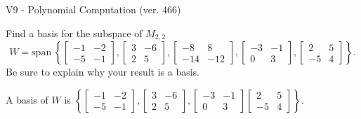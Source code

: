 \begin{exercise}
  \begin{exerciseTitle}V9 - Polynomial Computation (ver. 466)\end{exerciseTitle}
  \begin{exerciseStatement}
    Find a basis for the subspace of \(M_{2,2}\) 
\[W=\mathrm{span}\ \left\{\left[\begin{array}{cc}
-1 & -2 \\
-5 & -1
\end{array}\right] , \left[\begin{array}{cc}
3 & -6 \\
2 & 5
\end{array}\right] , \left[\begin{array}{cc}
-8 & 8 \\
-14 & -12
\end{array}\right] , \left[\begin{array}{cc}
-3 & -1 \\
0 & 3
\end{array}\right] , \left[\begin{array}{cc}
2 & 5 \\
-5 & 4
\end{array}\right]\right\}.\]
 Be sure to explain why your result is a basis.


  \end{exerciseStatement}
  \begin{exerciseAnswer}
   A basis of \(W\) is  \(\left\{\left[\begin{array}{cc}
-1 & -2 \\
-5 & -1
\end{array}\right] , \left[\begin{array}{cc}
3 & -6 \\
2 & 5
\end{array}\right] , \left[\begin{array}{cc}
-3 & -1 \\
0 & 3
\end{array}\right] \left[\begin{array}{cc}
2 & 5 \\
-5 & 4
\end{array}\right]\right\}\).
  


  \end{exerciseAnswer}
\end{exercise}